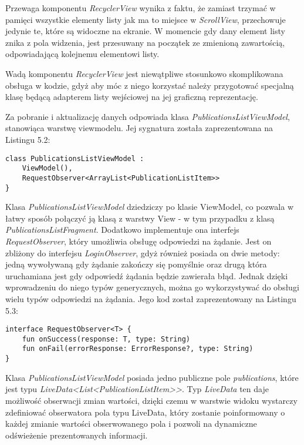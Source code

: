 \documentclass[a4paper,12pt,twoside,openany]{report}
\begin{document}
Przewaga komponentu \textit{RecyclerView} wynika z faktu, że zamiast trzymać w pamięci wszystkie elementy listy jak ma to miejsce w \textit{ScrollView}, przechowuje jedynie te, które są widoczne na ekranie. W momencie gdy dany element listy znika z pola widzenia, jest przesuwany na początek ze zmienioną zawartością, odpowiadającą kolejnemu elementowi listy. 

Wadą komponentu \textit{RecyclerView} jest niewątpliwe stosunkowo skomplikowana obsługa w kodzie, gdyż aby móc z niego korzystać należy przygotować specjalną klasę będącą adapterem listy wejściowej na jej graficzną reprezentację.

Za pobranie i aktualizację danych odpowiada klasa  \textit{PublicationsListViewModel}, stanowiąca warstwę viewmodelu.
Jej sygnatura została zaprezentowana na Listingu 5.2:

 \begin{lstlisting}[caption=Sygnatura klasy PublicationsListViewModel,label=code1,captionpos=b]
class PublicationsListViewModel : 
	ViewModel(),
	RequestObserver<ArrayList<PublicationListItem>>   
}
\end{lstlisting} 
Klasa \textit{PublicationsListViewModel} dziedziczy po klasie ViewModel, co pozwala w łatwy sposób połączyć ją klasą z warstwy View - w tym przypadku z klasą \textit{PublicationsListFragment}. Dodatkowo implementuje ona interfejs \textit{RequestObserver}, który umożliwia obsługę odpowiedzi na żądanie. Jest on zbliżony do interfejsu \textit{LoginObserver}, gdyż również posiada on dwie metody: jedną wywoływaną gdy żądanie zakończy się pomyślnie oraz drugą która uruchamiana jest gdy odpowiedź żądania będzie zawierała błąd. Jednak dzięki wprowadzeniu do niego typów generycznych, można go wykorzystywać do obsługi wielu typów odpowiedzi na żądania. Jego kod został zaprezentowany na Listingu 5.3:

 \begin{lstlisting}[caption=Interfejs RequestObserver,label=code1,captionpos=b]
interface RequestObserver<T> {
	fun onSuccess(response: T, type: String)
	fun onFail(errorResponse: ErrorResponse?, type: String)
}
\end{lstlisting} 
 Klasa \textit{PublicationsListViewModel} posiada jedno publiczne pole \textit{publications}, które jest typu \textit{LiveData<List<PublicationListItem>>}. Typ \textit{LiveData} ten daje możliwość obserwacji zmian wartości, dzięki czemu w warstwie widoku wystarczy zdefiniować obserwatora pola typu LiveData, który zostanie poinformowany o każdej zmianie wartości obserwowanego pola i pozwoli na dynamiczne odświeżenie prezentowanych informacji.
 
\end{document}
